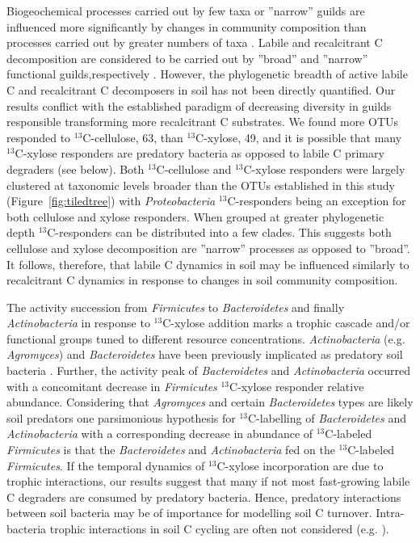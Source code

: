 Biogeochemical processes carried out by few taxa or ''narrow'' guilds are
influenced more significantly by changes in community composition than
processes carried out by greater numbers of taxa
\citep{Schimel_1995,McGuire2010}. Labile and recalcitrant C decomposition are
considered to be carried out by ''broad'' and ''narrow'' functional
guilds,respectively \citep{Schimel_1995,McGuire2010}. However, the phylogenetic
breadth of active labile C and recalcitrant C decomposers in soil has not been
directly quantified. Our results conflict with the established paradigm of
decreasing diversity in guilds responsible transforming more recalcitrant
C substrates. We found more OTUs responded to $^{13}$C-cellulose, 63, than
$^{13}$C-xylose, 49, and it is possible that many $^{13}$C-xylose responders
are predatory bacteria as opposed to labile C primary degraders (see below).
Both $^{13}$C-cellulose and $^{13}$C-xylose responders were largely clustered
at taxonomic levels broader than the OTUs established in this study
(Figure~\ref{fig:tiledtree}) with \textit{Proteobacteria} $^{13}$C-responders
being an exception for both cellulose and xylose responders. When grouped at
greater phylogenetic depth $^{13}$C-responders can be distributed into a few
clades. This suggests both cellulose and xylose decomposition are ''narrow''
processes as opposed to ''broad''. It follows, therefore, that labile C dynamics
in soil may be influenced similarly to recalcitrant C dynamics in response to
changes in soil community composition. 

The activity succession from \textit{Firmicutes} to \textit{Bacteroidetes} and
finally \textit{Actinobacteria} in response to $^{13}$C-xylose addition marks
a trophic cascade and/or functional groups tuned to different resource
concentrations. \textit{Actinobacteria} (e.g. \textit{Agromyces}) and
\textit{Bacteroidetes} have been previously implicated as predatory soil
bacteria \citep{Lueders2006}. Further, the activity peak of
\textit{Bacteroidetes} and \textit{Actinobacteria} occurred with a concomitant
decrease in \textit{Firmicutes} $^{13}$C-xylose responder relative abundance.
Considering that \textit{Agromyces} and certain \textit{Bacteroidetes} types
are likely soil predators \citep{Lueders2006,16346402} one parsimonious
hypothesis for $^{13}$C-labelling of \textit{Bacteroidetes} and
\textit{Actinobacteria} with a corresponding decrease in abundance of
$^{13}$C-labeled \textit{Firmicutes} is that the \textit{Bacteroidetes} and
\textit{Actinobacteria} fed on the $^{13}$C-labeled \textit{Firmicutes}. If the
temporal dynamics of $^{13}$C-xylose incorporation are due to trophic
interactions, our results suggest that many if not most fast-growing labile
C degraders are consumed by predatory bacteria. Hence, predatory interactions
between soil bacteria may be of importance for modelling soil C turnover.
Intra-bacteria trophic interactions in soil C cycling are often not considered
(e.g. \citep{Moore1988}).

